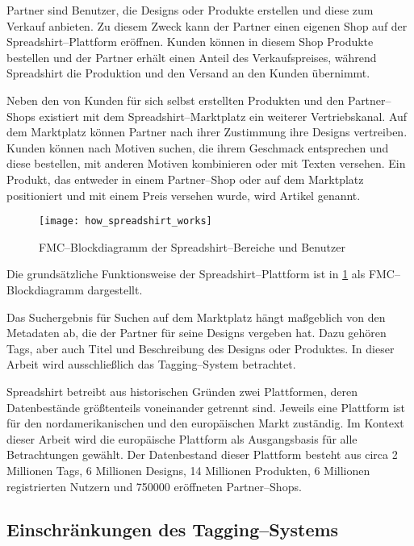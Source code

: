 Partner sind Benutzer, die Designs oder Produkte erstellen und diese zum Verkauf anbieten. Zu diesem Zweck kann der Partner einen eigenen Shop auf der Spreadshirt--Plattform eröffnen. Kunden können in diesem Shop Produkte bestellen und der Partner erhält einen Anteil des Verkaufspreises, während Spreadshirt die Produktion und den Versand an den Kunden übernimmt.

Neben den von Kunden für sich selbst erstellten Produkten und den Partner--Shops existiert mit dem Spreadshirt--Marktplatz ein weiterer Vertriebskanal. Auf dem Marktplatz können Partner nach ihrer Zustimmung ihre Designs vertreiben. Kunden können nach Motiven suchen, die ihrem Geschmack entsprechen und diese bestellen, mit anderen Motiven kombinieren oder mit Texten versehen. Ein Produkt, das entweder in einem Partner--Shop oder auf dem Marktplatz positioniert und mit einem Preis versehen wurde, wird Artikel genannt.

\begin{figure}
\centering
\texttt{[image: how\_spreadshirt\_works]}
\caption{FMC--Blockdiagramm der Spreadshirt--Bereiche und Benutzer}
\label{fig:howspreadshirtworks}
\end{figure}

Die grundsätzliche Funktionsweise der Spreadshirt--Plattform ist in \cref{fig:howspreadshirtworks} als FMC--Blockdiagramm dargestellt.

Das Suchergebnis für Suchen auf dem Marktplatz hängt maßgeblich von den Metadaten ab, die der Partner für seine Designs vergeben hat. Dazu gehören Tags, aber auch Titel und Beschreibung des Designs oder Produktes. In dieser Arbeit wird ausschließlich das Tagging--System betrachtet.

\label{platforms}
Spreadshirt betreibt aus historischen Gründen zwei Plattformen, deren Datenbestände größtenteils voneinander getrennt sind. Jeweils eine Plattform ist für den nordamerikanischen und den europäischen Markt zuständig. Im Kontext dieser Arbeit wird die europäische Plattform als Ausgangsbasis für alle Betrachtungen gewählt. Der Datenbestand dieser Plattform besteht aus circa 2 Millionen Tags, 6 Millionen Designs, 14 Millionen Produkten, 6 Millionen registrierten Nutzern und \num{750000} eröffneten Partner--Shops.

\subsection{Einschränkungen des Tagging--Systems}

